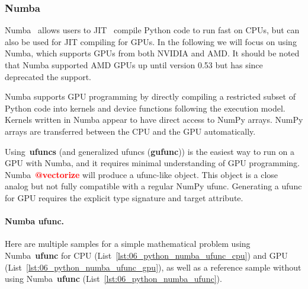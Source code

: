 \subsubsection{Numba}


\par
Numba~\cite{numba} allows users to JIT~\cite{jit} compile Python code to run fast on CPUs, but can also be used for JIT compiling for GPUs.
In the following we will focus on using Numba, which supports GPUs from both NVIDIA and AMD.
It should be noted that Numba supported AMD GPUs up until version 0.53 but has since deprecated the support.


\par
Numba supports GPU programming by directly compiling a restricted subset of Python code into kernels and device functions following the execution model.
Kernels written in Numba appear to have direct access to NumPy arrays.
NumPy arrays are transferred between the CPU and the GPU automatically.


\par
Using~\textbf{ufuncs} (and generalized ufuncs (\textbf{gufunc})) is the easiest way to run on a GPU with Numba, and it requires minimal understanding of GPU programming.
Numba~\textbf{\textcolor{red}{@vectorize}} will produce a ufunc-like object.
This object is a close analog but not fully compatible with a regular NumPy ufunc.
Generating a ufunc for GPU requires the explicit type signature and target attribute.


\paragraph{Numba ufunc.}
Here are multiple samples for a simple mathematical problem using Numba~\textbf{ufunc} for CPU (List~\ref{lst:06_python_numba_ufunc_cpu}) and GPU (List~\ref{lst:06_python_numba_ufunc_gpu}), as well as a reference sample without using Numba~\textbf{ufunc} (List~\ref{lst:06_python_numba_ufunc}).








